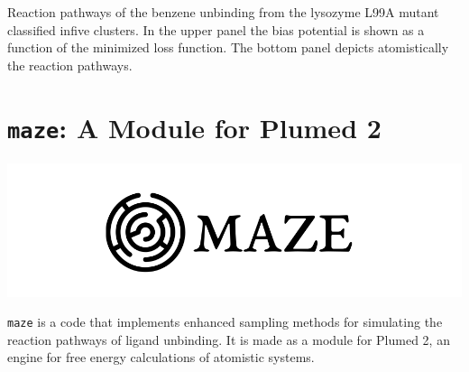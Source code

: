 \documentclass[a0,portrait]{a0poster}
\begin{document}
\begin{multicols}{2}
\noindent Reaction pathways of the benzene unbinding from the lysozyme L99A mutant
classified infive clusters.  In the upper panel the bias potential is shown as
a function of the minimized loss function.  The bottom panel depicts
atomistically the reaction pathways.

\section*{\huge\centering\color{myblue}\texttt{maze}: A Module for Plumed 2}
\vspace*{1cm}
\begin{minipage}[b]{\linewidth}
  \centering
  \includegraphics[width=20cm]{../fig/maze-icon.png}
\end{minipage}
\vspace*{1cm}

\noindent\texttt{maze} is a code that implements enhanced sampling methods for simulating 
the reaction pathways of ligand unbinding. It is made as a module for Plumed 2, an
engine for free energy calculations of atomistic systems.
\vspace*{1cm}


\end{multicols}
\end{document}

